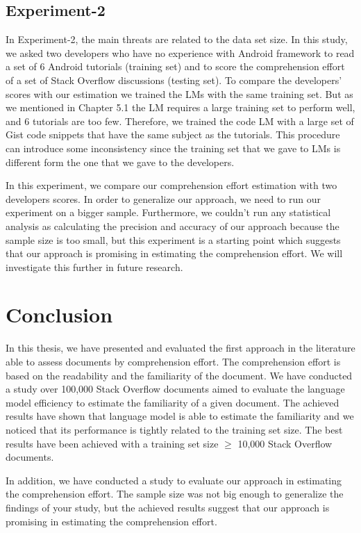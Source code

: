 \documentclass[12pt,mscthesis]{usiinfthesis}
\begin{document}
{\section{Experiment-2}
In Experiment-2, the main threats are related to the data set size. In this study, we asked two developers who have no experience with Android framework to read a set of 6 Android tutorials (training set) and to score the comprehension effort of a set of Stack Overflow discussions (testing set). To compare the developers' scores with our estimation we trained the LMs with the same training set. But as we mentioned in Chapter 5.1 the LM requires a large training set to perform well, and 6 tutorials are too few. Therefore, we trained the code LM  with a large set of Gist code snippets that have the same subject as the tutorials. This procedure can introduce some inconsistency since the training set that we gave to LMs is different form the one that we gave to the developers.

In this experiment, we compare our comprehension effort estimation with two developers scores. In order to generalize our approach, we need to run our experiment on a bigger sample. Furthermore, we couldn't run any statistical analysis as calculating the precision and accuracy of our approach because the sample size is too small, but this experiment is a starting point which suggests that our approach is promising in estimating the comprehension effort. We will investigate this further in future research.




\chapter{Conclusion}

In this thesis, we have presented and evaluated the first approach in the literature able to assess documents by comprehension effort. The comprehension effort is based on the readability and the familiarity of the document. We have conducted a study over 100,000 Stack Overflow documents aimed to evaluate the language model efficiency to estimate the familiarity of a given document. The achieved results have shown that language model is able to estimate the familiarity and we noticed that its performance is tightly related to the training set size. The best results have been achieved with a training set size $\ge$ 10,000 Stack Overflow documents.

In addition, we have conducted a study to evaluate our approach in estimating the comprehension effort. The sample size was not big enough to generalize the findings of your study, but the achieved results suggest that our approach is promising in estimating the comprehension effort.

}
\end{document}
